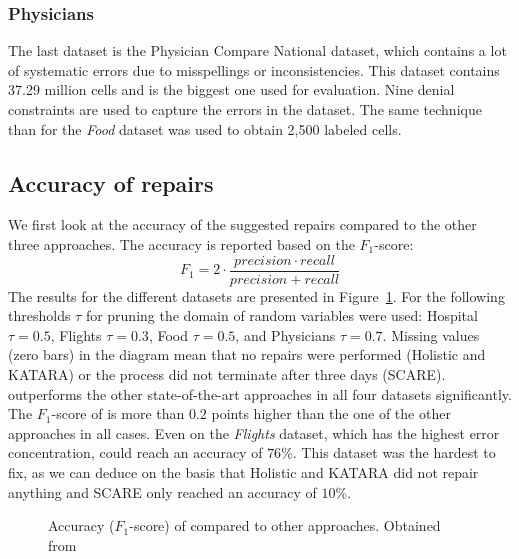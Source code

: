   \subsubsection*{Physicians}
  The last dataset is the Physician Compare National dataset, which contains a lot of systematic errors due to misspellings or inconsistencies.
  This dataset contains 37.29 million cells and is the biggest one used for evaluation.
  Nine denial constraints are used to capture the errors in the dataset.
  The same technique than for the \textit{Food} dataset was used to obtain 2,500 labeled cells.

  \subsection{Accuracy of repairs}
  We first look at the accuracy of the suggested repairs compared to the other three approaches.
  The accuracy is reported based on the $F_1$-score:
  \begin{equation}
    F_1 = 2 \cdot \frac{precision \cdot recall}{precision + recall}
  \end{equation}
  The results for the different datasets are presented in Figure~\ref{fig:accuracy}.
  For \holoclean{} the following thresholds $\tau$ for pruning the domain of random variables were used:
  Hospital $\tau = 0.5$, Flights $\tau = 0.3$, Food $\tau = 0.5$, and Physicians $\tau = 0.7$.
  Missing values (zero bars) in the diagram mean that no repairs were performed (Holistic and KATARA) or the process did not terminate after three days (SCARE).
  \holoclean{} outperforms the other state-of-the-art approaches in all four datasets significantly.
  The $F_1$-score of \holoclean{} is more than $0.2$ points higher than the one of the other approaches in all cases.
  Even on the \textit{Flights} dataset, which has the highest error concentration, \holoclean{} could reach an accuracy of $76\%$.
  This dataset was the hardest to fix, as we can deduce on the basis that Holistic and KATARA did not repair anything and SCARE only reached an accuracy of $10\%$.

  \begin{figure}
    \centering
    
    \caption{Accuracy ($F_1$-score) of \holoclean{} compared to other approaches. Obtained from~\cite{holoclean}}
    \label{fig:accuracy}
  \end{figure}

